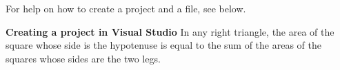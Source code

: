 \documentclass[a4paper,12pt]{book}
\begin{document}
                For help on how to create a project and a file, see below.

                
            
\begin{mdframed}[backgroundcolor=intro] 
\textbf{ Creating a project in Visual Studio }
In any right triangle, the area of the square whose side is the hypotenuse is equal to the sum of the areas of the squares whose sides are the two legs.
\end{mdframed}



            
\end{document}

